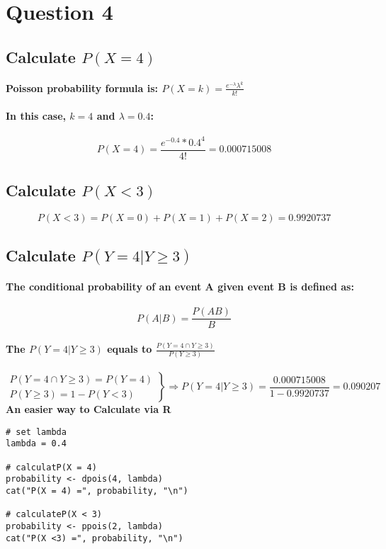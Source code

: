 \section{Question 4}
\subsection{Calculate $P(X=4)$}
\paragraph{Poisson probability formula is: $ P(X=k)=\frac{e^{- \lambda} \lambda^k}{k!} $}
\paragraph{In this case, $k=4$ and $\lambda=0.4$:}
$$ P(X=4)=\frac{e^{-0.4}*0.4^4}{4!}=0.000715008 $$
\subsection{Calculate $P(X<3)$}
$$ P(X<3)=P(X=0)+P(X=1)+P(X=2) =0.9920737 $$
\subsection{Calculate $P(Y=4 | Y \ge 3)$}
\paragraph{The conditional probability of an event A given event B is defined as:}
$$ P(A|B)=\frac{P(AB)}{B}$$
\paragraph{The $P(Y=4 | Y \ge 3)$ equals to $\frac{P(Y=4 \cap Y \ge 3)}{P(Y \ge 3)}$}
% 
\begin{equation*}
    \left.
    \begin{array}{ll}
        P(Y=4 \cap Y \ge 3) = P(Y=4) \\
        P(Y \ge 3)=1-P(Y < 3)
    \end{array}
    \right\}
    \Rightarrow
    P(Y=4 | Y \ge 3)=\frac{0.000715008}{1-0.9920737}=0.090207
\end{equation*}
\textbf{An easier way to Calculate via R}
% 
\begin{lstlisting}[style=rstyle]
# set lambda
lambda = 0.4

# calculatP(X = 4)
probability <- dpois(4, lambda)
cat("P(X = 4) =", probability, "\n")

# calculateP(X < 3)
probability <- ppois(2, lambda)
cat("P(X <3) =", probability, "\n")
\end{lstlisting}